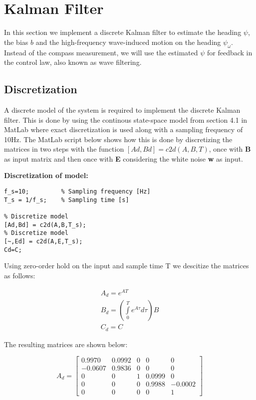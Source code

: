 \newpage
\section{Kalman Filter}

In this section we implement a discrete Kalman filter to estimate the heading $\psi$, the bias $b$ and the high-frequency wave-induced motion on the heading $\psi_{\omega}$. Instead of the compass measurement, we will use the estimated $\psi$ for feedback in the control law, also known as wave filtering.

\subsection{Discretization}
A discrete model of the system is required to implement the discrete Kalman filter. This is done by using the continous state-space model from section 4.1 in MatLab where exact discretization is used along with a sampling frequency of 10Hz. The MatLab script below shows how this is done by discretizing the matrices in two steps with the function $[Ad, Bd] = c2d(A,B,T)$, once with \textbf{B} as input matrix and then once with \textbf{E} considering the white noise \textbf{w} as input.

\textbf{Discretization of model:}
\begin{lstlisting}
f_s=10;         % Sampling frequency [Hz]
T_s = 1/f_s;    % Sampling time [s]

% Discretize model 
[Ad,Bd] = c2d(A,B,T_s);
% Discretize model 
[~,Ed] = c2d(A,E,T_s);
Cd=C;
\end{lstlisting}


Using zero-order hold on the input and sample time T we descitize the matrices as follows:

\begin{equation}\label{discmat}
    \begin{array}{l}
{A_d} = {e^{AT}}\\
{B_d} = \left( {\int\limits_0^T {{e^{A\tau }}d\tau } } \right)B\\
{C_d} = C
\end{array}
\end{equation}

The resulting matrices are shown below:

\begin{equation*}
    {A_d} = \left[ {\begin{array}{*{20}{c}}
{0.9970}&{0.0992}&0&0&0\\
{ - 0.0607}&{0.9836}&0&0&0\\
0&0&1&{0.0999}&0\\
0&0&0&{0.9988}&{ - 0.0002}\\
0&0&0&0&1
\end{array}} \right]
\end{equation*}


